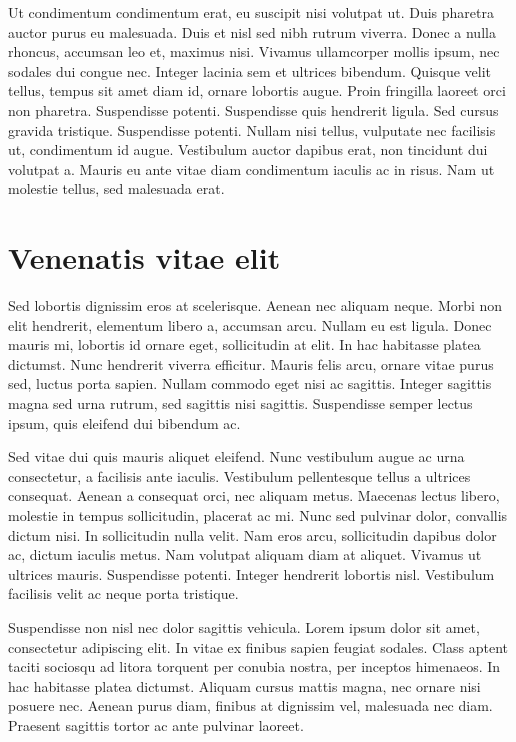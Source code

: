 Ut condimentum condimentum erat, eu suscipit nisi volutpat ut. Duis pharetra auctor purus eu malesuada. Duis et nisl sed nibh rutrum viverra. Donec a nulla rhoncus, accumsan leo et, maximus nisi. Vivamus ullamcorper mollis ipsum, nec sodales dui congue nec. Integer lacinia sem et ultrices bibendum. Quisque velit tellus, tempus sit amet diam id, ornare lobortis augue. Proin fringilla laoreet orci non pharetra. Suspendisse potenti. Suspendisse quis hendrerit ligula. Sed cursus gravida tristique. Suspendisse potenti. Nullam nisi tellus, vulputate nec facilisis ut, condimentum id augue. Vestibulum auctor dapibus erat, non tincidunt dui volutpat a. Mauris eu ante vitae diam condimentum iaculis ac in risus. Nam ut molestie tellus, sed malesuada erat.

\section{Venenatis vitae elit}
Sed lobortis dignissim eros at scelerisque. Aenean nec aliquam neque. Morbi non elit hendrerit, elementum libero a, accumsan arcu. Nullam eu est ligula. Donec mauris mi, lobortis id ornare eget, sollicitudin at elit. In hac habitasse platea dictumst. Nunc hendrerit viverra efficitur. Mauris felis arcu, ornare vitae purus sed, luctus porta sapien. Nullam commodo eget nisi ac sagittis. Integer sagittis magna sed urna rutrum, sed sagittis nisi sagittis. Suspendisse semper lectus ipsum, quis eleifend dui bibendum ac.

Sed vitae dui quis mauris aliquet eleifend. Nunc vestibulum augue ac urna consectetur, a facilisis ante iaculis. Vestibulum pellentesque tellus a ultrices consequat. Aenean a consequat orci, nec aliquam metus. Maecenas lectus libero, molestie in tempus sollicitudin, placerat ac mi. Nunc sed pulvinar dolor, convallis dictum nisi. In sollicitudin nulla velit. Nam eros arcu, sollicitudin dapibus dolor ac, dictum iaculis metus. Nam volutpat aliquam diam at aliquet. Vivamus ut ultrices mauris. Suspendisse potenti. Integer hendrerit lobortis nisl. Vestibulum facilisis velit ac neque porta tristique.

Suspendisse non nisl nec dolor sagittis vehicula. Lorem ipsum dolor sit amet, consectetur adipiscing elit. In vitae ex finibus sapien feugiat sodales. Class aptent taciti sociosqu ad litora torquent per conubia nostra, per inceptos himenaeos. In hac habitasse platea dictumst. Aliquam cursus mattis magna, nec ornare nisi posuere nec. Aenean purus diam, finibus at dignissim vel, malesuada nec diam. Praesent sagittis tortor ac ante pulvinar laoreet.

